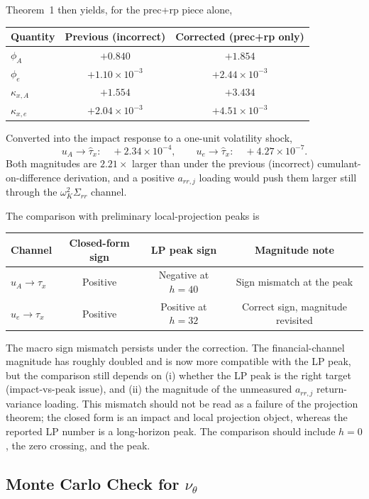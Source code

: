 \documentclass[11pt]{article}
\theoremstyle{plain}
\theoremstyle{definition}
\begin{document}
Theorem~1 then yields, for the prec+rp piece alone,
\begin{center}
\begin{tabular}{lcc}
\toprule
Quantity & Previous (incorrect) & Corrected (prec+rp only) \\
\midrule
$\phi_A$ & $+0.840$ & $+1.854$ \\
$\phi_e$ & $+1.10\times 10^{-3}$ & $+2.44\times 10^{-3}$ \\
$\kappa_{x,A}$ & $+1.554$ & $+3.434$ \\
$\kappa_{x,e}$ & $+2.04\times 10^{-3}$ & $+4.51\times 10^{-3}$ \\
\bottomrule
\end{tabular}
\end{center}

Converted into the impact response to a one-unit volatility shock,
\[
u_A\to\hat\tau_x:\quad +2.34\times 10^{-4},
\qquad
u_e\to\hat\tau_x:\quad +4.27\times 10^{-7}.
\]
Both magnitudes are $2.21\times$ larger than under the previous
(incorrect) cumulant-on-difference derivation, and a positive $a_{rr,j}$
loading would push them larger still through the $\omega_K^2\Sigma_{rr}$
channel.

The comparison with preliminary local-projection peaks is
\begin{center}
\begin{tabular}{lccc}
\toprule
Channel & Closed-form sign & LP peak sign & Magnitude note \\
\midrule
$u_A\to\tau_x$ & Positive & Negative at $h=40$ & Sign mismatch at the peak \\
$u_e\to\tau_x$ & Positive & Positive at $h=32$ & Correct sign, magnitude
revisited \\
\bottomrule
\end{tabular}
\end{center}

The macro sign mismatch persists under the correction. The financial-channel
magnitude has roughly doubled and is now more compatible with the LP peak,
but the comparison still depends on (i) whether the LP peak is the right
target (impact-vs-peak issue), and (ii) the magnitude of the unmeasured
$a_{rr,j}$ return-variance loading. This mismatch should not be read as a
failure of the projection theorem; the closed form is an impact and local
projection object, whereas the reported LP number is a long-horizon peak.
The comparison should include $h=0$, the zero crossing, and the peak.

\subsection{Monte Carlo Check for \texorpdfstring{$\nu_\theta$}{nu theta}}
\label{subsec:monte-carlo-nu}
\end{document}
